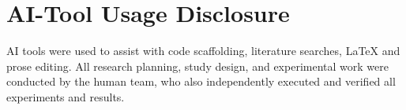 \documentclass[11pt]{article}
\begin{document}
\section*{AI-Tool Usage Disclosure}
AI tools were used to assist with code scaffolding, literature searches, LaTeX and prose editing. All research planning, study design, and experimental work were conducted by the human team, who also independently executed and verified all experiments and results.



\end{document}
